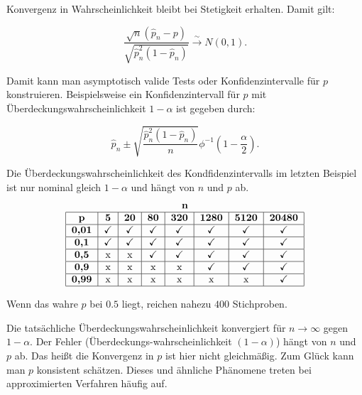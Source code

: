 \documentclass[10pt]{article}
\newcommand{\KV}{\overset{\sim} \longrightarrow} %
\newenvironment{BSP}[1][]
{\begin{Beispiel}[frametitle=#1]}{\end{Beispiel}}
\begin{document}
\begin{BSP}[Beispiel 1.3.6 (Delta-Methode)]
		\noindent Konvergenz in Wahrscheinlichkeit bleibt bei Stetigkeit erhalten. Damit gilt:
		
		\begin{equation*}
			\frac{\sqrt{n}(\hat{p}_n-p)}{\sqrt{\hat{p}_n^2(1-\hat{p}_n)}} \KV N(0,1).
		\end{equation*}
		
		Damit kann man asymptotisch valide Tests oder Konfidenzintervalle für $p$ konstruieren. Beispielsweise ein Konfidenzintervall für $p$ mit Überdeckungswahrscheinlichkeit $1-\alpha$ ist gegeben durch:
		
		\begin{equation*}
			\hat{p}_n \pm \sqrt{\frac{\hat{p}_n^2 (1-\hat{p}_n)}{n}} \phi^{-1} \left(1-\frac{\alpha}{2}\right).
		\end{equation*}
		
	\end{BSP}
	
	\noindent Die Überdeckungswahrscheinlichkeit des Kondfidenzintervalls im letzten Beispiel ist nur nominal gleich $1-\alpha$ und hängt von $n$ und $p$ ab. 
	\begin{align*}
		\begin{tabular}{|c|c|c|c|c|c|c|c|}
			\multicolumn{8}{c}{$\textbf{n}$}\\
			\hline
			\textbf{p} & \textbf{5} & \textbf{20} & \textbf{80} & \textbf{320} & \textbf{1280} & \textbf{5120} & \textbf{20480}\\
			\hline
			\textbf{0,01} & \checkmark & \checkmark & \checkmark & \checkmark & \checkmark & \checkmark & \checkmark \\
			\hline
			\textbf{0,1} & \checkmark & \checkmark & \checkmark & \checkmark & \checkmark & \checkmark & \checkmark\\
			\hline
			\textbf{0,5} & x & x & \checkmark & \checkmark & \checkmark & \checkmark & \checkmark\\
			\hline
			\textbf{0,9} &x &x &x &x & \checkmark& \checkmark& \checkmark\\
			\hline
			\textbf{0,99} &x &x &x &x &x &x & \checkmark \\
			\hline
		\end{tabular}
	\end{align*}
	
	
	
	\noindent Wenn das wahre $p$ bei $0.5$ liegt, reichen nahezu $400$ Stichproben. 
	
	Die tatsächliche Überdeckungswahrscheinlichkeit konvergiert für  $n \rightarrow \infty$ gegen $1-\alpha$. Der Fehler (Überdeckungs-wahrscheinlichkeit $(1-\alpha)$) hängt von $n$ und $p$ ab. Das heißt die Konvergenz in $p$ ist hier nicht gleichmäßig. Zum Glück kann man $p$ konsistent schätzen. Dieses und ähnliche Phänomene treten bei approximierten Verfahren häufig auf. 
	
\end{document}
